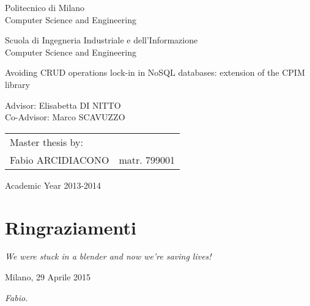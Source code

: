 \begin{titlepage}
\vspace*{-2.5cm}
\bfseries
\begin{center}
  \LARGE
  Politecnico di Milano\\
  \Large
  Computer Science and Engineering\\


\begin{large}
Scuola di Ingegneria Industriale e dell'Informazione\\
Computer Science and Engineering\\
\end{large}

\vspace{2.0cm}
\begin{Large}
Avoiding CRUD operations lock-in in NoSQL databases: extension of the CPIM library
\end{Large}  
\end{center}

\vspace*{4cm}
\large
\begin{flushleft}
\hspace{-2cm}  Advisor: Elisabetta DI NITTO\\
\hspace{-2cm}  Co-Advisor: Marco SCAVUZZO\\
\end{flushleft}
\vspace*{1.5cm}

\hspace{6cm}
\parbox{10cm}{
    \begin{tabular}{ll}
         Master thesis by: & \\
         Fabio ARCIDIACONO & matr. 799001\\
    \end{tabular}
}

\vspace*{2cm}
\begin{center}
  Academic Year 2013-2014
\end{center}

\end{titlepage}
\cleardoublepage

\thispagestyle{empty}

\chapter*{Ringraziamenti}

\noindent \textit{We were stuck in a blender and now we're saving lives!}

\begin{flushleft}
Milano, 29 Aprile 2015
\end{flushleft}

\begin{flushright}
\emph{Fabio.}
\end{flushright}

\cleardoublepage